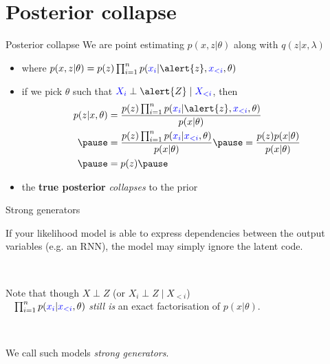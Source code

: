 \section{Posterior collapse}

\begin{frame}{Posterior collapse}
We are point estimating $p(x,z|\theta)$ along with $q(z|x, \lambda)$
\begin{itemize}
	\item where $p(x,z|\theta) = p(z) \prod_{i=1}^n p(\textcolor{blue}{x_i}|\alert{z}, \textcolor{blue}{x_{<i}}, \theta)$ \pause
	\item if we pick $\theta$ such that $\textcolor{blue}{X_i} \perp \alert{Z} \mid \textcolor{blue}{X_{<i}}$, then  \pause
	\begin{equation*}
	\begin{aligned}
		p(z|x, \theta) &=  \frac{p(z) \prod_{i=1}^n p(\textcolor{blue}{x_i}|\alert{z}, \textcolor{blue}{x_{<i}}, \theta) }{p(x|\theta)}  \\ \pause
		&= \frac{p(z) \prod_{i=1}^n p(\textcolor{blue}{x_i}|\textcolor{blue}{x_{<i}}, \theta) }{p(x|\theta)}  \pause = \frac{p(z)p(x|\theta)}{p(x|\theta)} \\ \pause
		&= p(z) \pause
	\end{aligned}	
	\end{equation*}
	\item the {\bf true posterior} \emph{collapses} to the prior 
	\end{itemize}
\end{frame}

\begin{frame}{Strong generators}

If your likelihood model is able to express dependencies between the output variables (e.g. an RNN), the model may simply ignore the latent code.

~

Note that though $X \perp Z$ (or $X_i \perp Z \mid X_{<i}$)\\
~ $\prod_{i=1}^n p(\textcolor{blue}{x_i}|\textcolor{blue}{x_{<i}}, \theta)$ \emph{still is} an exact factorisation of $p(x|\theta)$.

~

We call such models \emph{strong generators}.

\end{frame}

